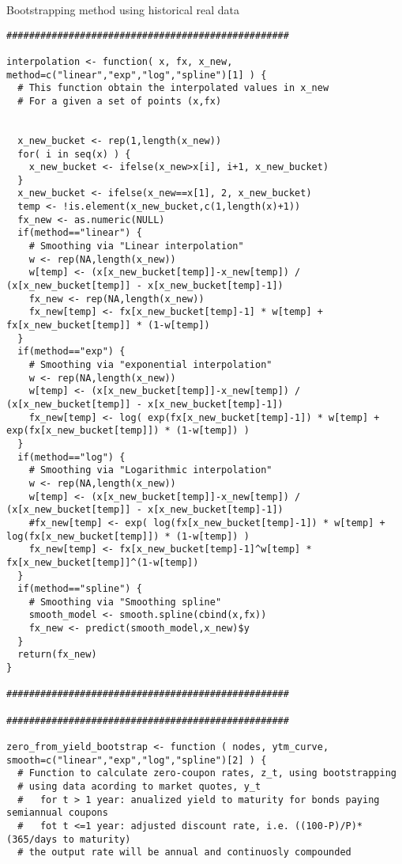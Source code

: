 \documentclass[letterpaper,10pt,english]{/anaconda/lib/python2.7/site-packages/sphinx/texinputs/sphinxhowto}
\begin{document}
Bootstrapping method using historical real data\begin{verbatim}
##################################################

interpolation <- function( x, fx, x_new, method=c("linear","exp","log","spline")[1] ) {
  # This function obtain the interpolated values in x_new
  # For a given a set of points (x,fx)
  
  
  x_new_bucket <- rep(1,length(x_new))
  for( i in seq(x) ) {
    x_new_bucket <- ifelse(x_new>x[i], i+1, x_new_bucket)
  }
  x_new_bucket <- ifelse(x_new==x[1], 2, x_new_bucket)
  temp <- !is.element(x_new_bucket,c(1,length(x)+1))
  fx_new <- as.numeric(NULL)
  if(method=="linear") {
    # Smoothing via "Linear interpolation"
    w <- rep(NA,length(x_new))
    w[temp] <- (x[x_new_bucket[temp]]-x_new[temp]) / (x[x_new_bucket[temp]] - x[x_new_bucket[temp]-1])
    fx_new <- rep(NA,length(x_new))
    fx_new[temp] <- fx[x_new_bucket[temp]-1] * w[temp] + fx[x_new_bucket[temp]] * (1-w[temp])
  }
  if(method=="exp") {
    # Smoothing via "exponential interpolation"
    w <- rep(NA,length(x_new))
    w[temp] <- (x[x_new_bucket[temp]]-x_new[temp]) / (x[x_new_bucket[temp]] - x[x_new_bucket[temp]-1])
    fx_new[temp] <- log( exp(fx[x_new_bucket[temp]-1]) * w[temp] + exp(fx[x_new_bucket[temp]]) * (1-w[temp]) )
  }
  if(method=="log") {
    # Smoothing via "Logarithmic interpolation"
    w <- rep(NA,length(x_new))
    w[temp] <- (x[x_new_bucket[temp]]-x_new[temp]) / (x[x_new_bucket[temp]] - x[x_new_bucket[temp]-1])
    #fx_new[temp] <- exp( log(fx[x_new_bucket[temp]-1]) * w[temp] + log(fx[x_new_bucket[temp]]) * (1-w[temp]) )
    fx_new[temp] <- fx[x_new_bucket[temp]-1]^w[temp] * fx[x_new_bucket[temp]]^(1-w[temp])
  }
  if(method=="spline") {
    # Smoothing via "Smoothing spline"
    smooth_model <- smooth.spline(cbind(x,fx))
    fx_new <- predict(smooth_model,x_new)$y
  }
  return(fx_new)
}

##################################################

##################################################

zero_from_yield_bootstrap <- function ( nodes, ytm_curve, smooth=c("linear","exp","log","spline")[2] ) {
  # Function to calculate zero-coupon rates, z_t, using bootstrapping
  # using data acording to market quotes, y_t
  #   for t > 1 year: anualized yield to maturity for bonds paying semiannual coupons
  #   fot t <=1 year: adjusted discount rate, i.e. ((100-P)/P)*(365/days to maturity)
  # the output rate will be annual and continuosly compounded
  

\end{verbatim}
\end{document}
